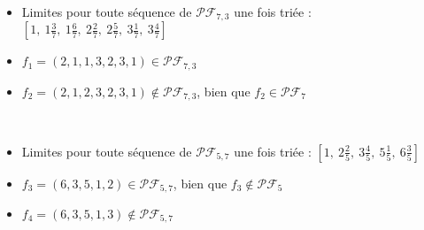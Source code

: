 \begin{example}[Définition 10 : $a > b$ : $a = 7$, $b = 3$]
    ~
    \begin{itemize}
        \item Limites pour toute séquence de $\mathcal{PF}_{7,3}$
            une fois triée : $[1,\ 1 \frac{3}{7},\ 1 \frac{6}{7},\ 
            2 \frac{2}{7},\ 2 \frac{5}{7},\ 3 \frac{1}{7},\ 
            3 \frac{4}{7}]$
        \item $f_1 = (2, 1, 1, 3, 2, 3, 1) \in
            \mathcal{PF}_{7,3}$
        \item $f_2 = (2, 1, 2, 3, 2, 3, 1) \notin
            \mathcal{PF}_{7,3}$, bien que $f_2 \in
            \mathcal{PF}_7$
    \end{itemize}
\end{example}

\begin{example}[Définition 10 : $a < b$ : $a = 5$, $b = 7$]
    ~
    \begin{itemize}
        \item Limites pour toute séquence de $\mathcal{PF}_{5,7}$
            une fois triée : $[1,\ 2 \frac{2}{5},\ 3 \frac{4}{5},\ 
            5 \frac{1}{5},\ 6 \frac{3}{5}]$
        \item $f_3 = (6, 3, 5, 1, 2) \in
            \mathcal{PF}_{5,7}$, bien que $f_3 \notin
            \mathcal{PF}_5$
        \item $f_4 = (6, 3, 5, 1, 3) \notin
            \mathcal{PF}_{5,7}$\\
    \end{itemize}
\end{example}